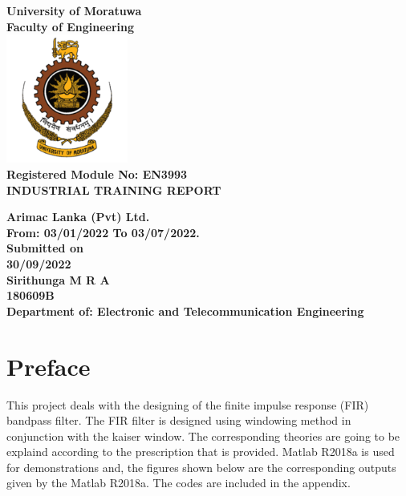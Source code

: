 \documentclass[twoside,12pt,times,onecolumn,a4paper]{report}
\begin{document}
\begin{titlepage}
\pagecolor{lightpink}\afterpage{\nopagecolor}
\center 

\textbf{\Huge University of Moratuwa}\\[1cm]
\textbf{\Large Faculty of Engineering}\\[1cm]

\includegraphics[width=0.3\textwidth]{uomlogo}\\[2cm]

	
\textbf{\Large {Registered Module No: EN3993 }  }\\[1cm]
\textbf{\Large {INDUSTRIAL TRAINING REPORT}}\\[1cm]
\vspace{1cm}

\begin{minipage}{1\textwidth}
	\begin{flushleft}
		\center 
		\textbf{\Large {Arimac Lanka (Pvt) Ltd.}  }\\[1cm]
		\textbf{\Large {From: 03/01/2022 To 03/07/2022.}  }\\[1cm]
		\textbf{\large Submitted on}\\[0.1cm]
		\textbf{\Large 30/09/2022}\\[0.5cm]
		\textbf{\large Sirithunga M R A}\\[0.1cm]
		\textbf{\large 180609B}\\[0.5cm]
		\textbf{\large Department of: Electronic and Telecommunication Engineering}\\[0.5cm]
	\end{flushleft}
\end{minipage}
\hspace{5mm}



\vfill
\end{titlepage}

\chapter{Preface}
\hspace{3em}This project deals with the designing of the finite impulse response (FIR) bandpass filter. The FIR filter is designed using windowing method in conjunction with the kaiser window. The corresponding theories are going to be explaind according to the prescription that is provided. Matlab R2018a  is used for demonstrations and, the figures shown below  are the corresponding outputs given by the Matlab R2018a. The codes are included in the appendix.
\end{document}
